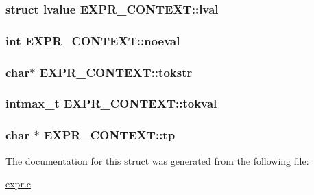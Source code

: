 \subsubsection[{\texorpdfstring{lval}{lval}}]{\setlength{\rightskip}{0pt plus 5cm}struct {\bf lvalue} E\+X\+P\+R\+\_\+\+C\+O\+N\+T\+E\+X\+T\+::lval}\hypertarget{structEXPR__CONTEXT_ab497084844b30afe35fbb51b06fb6505}{}\label{structEXPR__CONTEXT_ab497084844b30afe35fbb51b06fb6505}
\subsubsection[{\texorpdfstring{noeval}{noeval}}]{\setlength{\rightskip}{0pt plus 5cm}int E\+X\+P\+R\+\_\+\+C\+O\+N\+T\+E\+X\+T\+::noeval}\hypertarget{structEXPR__CONTEXT_a164e4613724fa3f72f3460f58d595e5a}{}\label{structEXPR__CONTEXT_a164e4613724fa3f72f3460f58d595e5a}
\subsubsection[{\texorpdfstring{tokstr}{tokstr}}]{\setlength{\rightskip}{0pt plus 5cm}char$\ast$ E\+X\+P\+R\+\_\+\+C\+O\+N\+T\+E\+X\+T\+::tokstr}\hypertarget{structEXPR__CONTEXT_a5b236994684e80356f71a1aec4f7d0c7}{}\label{structEXPR__CONTEXT_a5b236994684e80356f71a1aec4f7d0c7}
\subsubsection[{\texorpdfstring{tokval}{tokval}}]{\setlength{\rightskip}{0pt plus 5cm}intmax\+\_\+t E\+X\+P\+R\+\_\+\+C\+O\+N\+T\+E\+X\+T\+::tokval}\hypertarget{structEXPR__CONTEXT_abbae8e63dab085277ea9e730a3b84692}{}\label{structEXPR__CONTEXT_abbae8e63dab085277ea9e730a3b84692}
\subsubsection[{\texorpdfstring{tp}{tp}}]{\setlength{\rightskip}{0pt plus 5cm}char $\ast$ E\+X\+P\+R\+\_\+\+C\+O\+N\+T\+E\+X\+T\+::tp}\hypertarget{structEXPR__CONTEXT_ab7a73351a352ce4e87d11ca20144ecdf}{}\label{structEXPR__CONTEXT_ab7a73351a352ce4e87d11ca20144ecdf}


The documentation for this struct was generated from the following file\+:\begin{DoxyCompactItemize}
\item 
\hyperlink{expr_8c}{expr.\+c}\end{DoxyCompactItemize}
